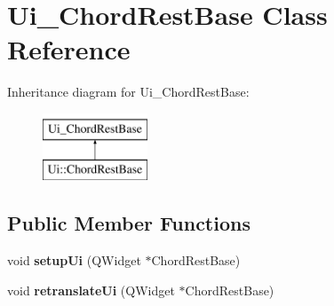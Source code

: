 \hypertarget{class_ui___chord_rest_base}{}\section{Ui\+\_\+\+Chord\+Rest\+Base Class Reference}
\label{class_ui___chord_rest_base}
Inheritance diagram for Ui\+\_\+\+Chord\+Rest\+Base\+:\begin{figure}[H]
\begin{center}
\leavevmode
\includegraphics[height=2.000000cm]{class_ui___chord_rest_base}
\end{center}
\end{figure}
\subsection*{Public Member Functions}
\begin{DoxyCompactItemize}
\item 
\mbox{\label{class_ui___chord_rest_base_a0533be84bc72e16c6b7ceeed7a0b2566}} 
void {\bfseries setup\+Ui} (Q\+Widget $\ast$Chord\+Rest\+Base)
\item 
\mbox{\label{class_ui___chord_rest_base_a7049e507eee68010d951e69317efcdf3}} 
void {\bfseries retranslate\+Ui} (Q\+Widget $\ast$Chord\+Rest\+Base)
\end{DoxyCompactItemize}
